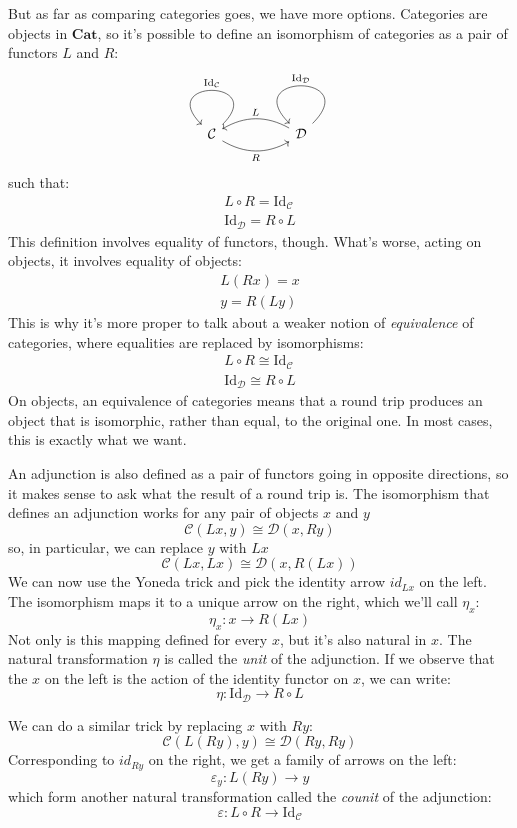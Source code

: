 \documentclass[DaoFP]{subfiles}
\begin{document}
But as far as comparing categories goes, we have more options. Categories are objects in $\mathbf{Cat}$, so it's possible to define an isomorphism of categories as a pair of functors $L$ and $R$:
\[
 \begin{tikzcd}
  \mathcal{C}
  \arrow[rr, bend right, "R"']
  \arrow[loop, "\text{Id}_{ \mathcal{C}} "']
  &&
  \mathcal{D}
  \arrow[ll, bend right, "L"']
  \arrow[loop, "\text{Id}_{ \mathcal{D}} "']
  \end{tikzcd}
\]
such that:
\begin{align*}
L \circ R = \text{Id}_{ \mathcal{C}} \\
\text{Id}_{ \mathcal{D}} = R \circ L 
\end{align*}
This definition involves equality of functors, though. What's worse, acting on objects, it involves equality of objects:
\begin{align*}
 L (R x) = x \\
 y = R (L y)
\end{align*}
This is why it's more proper to talk about a weaker notion of \emph{equivalence} of categories, where equalities are replaced by isomorphisms:
\begin{align*}
L \circ R \cong \text{Id}_{ \mathcal{C}} \\
 \text{Id}_{ \mathcal{D}} \cong R \circ L 
\end{align*}
On objects, an equivalence of categories means that a round trip produces an object that is isomorphic, rather than equal, to the original one. In most cases, this is exactly what we want.

An adjunction is also defined as a pair of functors going in opposite directions, so it makes sense to ask what the result of a round trip is. The isomorphism that defines an adjunction works for any pair of objects $x$ and $y$
\[  \mathcal{C} (L x, y) \cong \mathcal{D}( x , R y)\]
so, in particular, we can replace $y$ with $L x$
\[  \mathcal{C} (L x, L x) \cong \mathcal{D}( x , R (L x))\]
We can now use the Yoneda trick and pick the identity arrow $id_{L x}$ on the left. The isomorphism maps it to a unique arrow on the right, which we'll call $\eta_x$:
\[ \eta_x \colon x \to R ( L x) \]
Not only is this mapping defined for every $x$, but it's also natural in $x$. The natural transformation $\eta$ is called the \emph{unit} of the adjunction. If we observe that the $x$ on the left is the action of the identity functor on $x$, we can write:
\[ \eta \colon \text{Id}_{\mathcal{D}} \to R \circ L \]

We can do a similar trick by replacing $x$ with $R y$:
\[  \mathcal{C} (L (R y), y) \cong \mathcal{D}( R y , R y)\]
Corresponding to $id_{R y}$ on the right, we get a family of arrows on the left:
\[ \varepsilon_y \colon L (R y) \to y \]
which form another natural transformation called the \emph{counit} of the adjunction:
\[ \varepsilon \colon L \circ R \to \text{Id}_{\mathcal{C}}  \]
\end{document}

